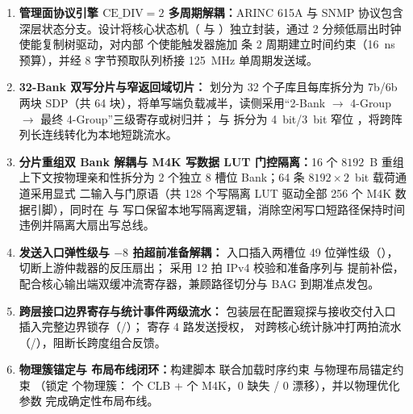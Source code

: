 \begin{enumerate}[leftmargin=2em,itemsep=2pt]
  \item \textbf{管理面协议引擎 $\text{CE\_DIV}=2$ 多周期解耦：}ARINC 615A 与 SNMP 协议包含深层状态分支。设计将核心状态机（ 与 ）独立封装，通过 2 分频低扇出时钟使能复制树驱动，对内部 \MulticycleRegs{} 个使能触发器施加 \MulticycleRules{} 条 2 周期建立时间约束（16~ns 预算），并经  8 字节预取队列桥接 125~MHz 单周期发送域。
  \item \textbf{ 32-Bank 双写分片与窄返回域切片：} 划分为 32 个子库且每库拆分为 7b/6b 两块 SDP（共 64 块），将单写端负载减半，读侧采用“2-Bank $\rightarrow$ 4-Group $\rightarrow$ 最终 4-Group”三级寄存或树归并； 与  拆分为 4~bit/3~bit 窄位 ，将跨阵列长连线转化为本地短跳流水。
  \item \textbf{分片重组双 Bank 解耦与 M4K 写数据 LUT 门控隔离：}16 个 $8192$~B 重组上下文按物理亲和性拆分为 2 个独立 8 槽位 Bank；64 条 $8192\times 2$~bit 载荷通道采用显式  二输入与门原语（共 128 个写隔离 LUT 驱动全部 256 个 M4K 数据引脚），同时在  与  写口保留本地写隔离逻辑，消除空闲写口短路径保持时间违例并隔离大扇出写总线。
  \item \textbf{发送入口弹性级与 $-8$ 拍超前准备解耦：} 入口插入两槽位 49 位弹性级（），切断上游仲裁器的反压扇出； 采用 12 拍 IPv4 校验和准备序列与  提前补偿，配合核心输出端双缓冲流寄存器，兼顾路径切分与 BAG 到期准点发包。
  \item \textbf{跨层接口边界寄存与统计事件两级流水：} 包装层在配置窥探与接收交付入口插入完整边界锁存（/）； 寄存 4 路发送授权， 对跨核心统计脉冲打两拍流水（/），阻断长跨度组合反馈。
  \item \textbf{ 物理簇锚定与  布局布线闭环：}构建脚本  联合加载时序约束  与物理布局锚定约束 （锁定 \LockedClusters{} 个物理簇：\Clb{} 个 CLB + \Mem{} 个 M4K，0 缺失 / 0 漂移），并以物理优化参数  完成确定性布局布线。
\end{enumerate}

